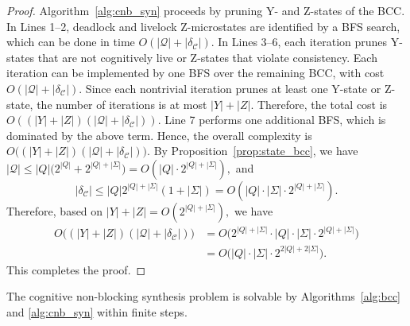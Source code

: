 \documentclass[journal,twoside,web]{ieeecolor}
\begin{document}
\begin{proof}
Algorithm~\ref{alg:cnb_syn} proceeds by pruning Y- and Z-states of the BCC.
In Lines 1--2, deadlock and livelock Z-microstates are identified by a BFS
search, which can be done in time
$
O(|\bm{\mathcal{Q}}|+|\delta_{\mathcal{C}}|)
$.
%
In Lines 3--6, each iteration prunes Y-states that are not cognitively live
or Z-states that violate consistency. Each iteration can be implemented by one
BFS over the remaining BCC, with cost
$
O(|\bm{\mathcal{Q}}|+|\delta_{\mathcal{C}}|)
$.
Since each nontrivial iteration prunes at least one Y-state or Z-state, the
number of iterations is at most $|Y|+|Z|$. Therefore, the total cost is
$
    O((|Y|+|Z|)(|\bm{\mathcal{Q}}|+|\delta_{\mathcal{C}}|)).
$
Line 7 performs one additional BFS, which is dominated by the above term.
Hence, the overall complexity is
$
    O\big((|Y|+|Z|)(|\bm{\mathcal{Q}}|+|\delta_{\mathcal{C}}|)\big).
$
%
By Proposition~\ref{prop:state_bcc}, we have
$
    |\bm{\mathcal{Q}}|
    \le
    |Q|\big(2^{|Q|}+2^{|Q|+|\Sigma|}\big)
    =
    O(|Q|\cdot 2^{|Q|+|\Sigma|}),
$
and
$$
    |\delta_{\mathcal{C}}|
    \le
    |Q|2^{|Q|+|\Sigma|}(1+|\Sigma|)
    =
    O(|Q|\cdot |\Sigma|\cdot 2^{|Q|+|\Sigma|}).
$$
Therefore, based on
$
|Y|+|Z| = O(2^{|Q|+|\Sigma|}),
$
we have
$$
\begin{aligned}
    O\big((|Y|+|Z|)(|\bm{\mathcal{Q}}|+|\delta_{\mathcal{C}}|)\big)
    &=
    O\big(
    2^{|Q|+|\Sigma|}
    \cdot
    |Q|\cdot |\Sigma|\cdot 2^{|Q|+|\Sigma|}
    \big) \\
    &=
    O\big(|Q|\cdot |\Sigma|\cdot 2^{2|Q|+2|\Sigma|}\big).
\end{aligned}
$$
This completes the proof.
\end{proof}
%


\begin{corollary}
    The cognitive non-blocking synthesis problem is solvable by Algorithms~\ref{alg:bcc} and \ref{alg:cnb_syn} within finite steps.
\end{corollary}




\end{document}
